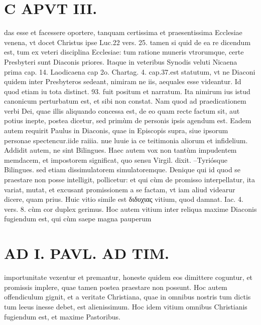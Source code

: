 \documentclass{article}
\begin{document}
\begin{pages}
\section*{C APVT III. }
\marginpar{[ p.153 ]}\pstart das esse et facessere oportere, tanquam certissima et praesentissima Ecclesiae venena, vt docet Christus ipse Luc.22 vers. 25. tamen si quid de ea re dicendum est, tum ex veteri disciplina Ecclesiae: tum ratione muneris vtrorumque, certe Presbyteri sunt Diaconis priores. Itaque in veteribus Synodis veluti Nicaena prima cap. 14. Laodicaena cap 2o. Chartag. 4. cap.37.est statutum, vt ne Diaconi quidem inter Presbyteros sedeant, nimiram ne iis, aequales esse videantur. Id quod etiam iu tota distinct. 93. fuit positum et narratum. Ita nimirum ius istud canonicum perturbatum est, et sibi non constat. Nam quod ad praedicationem verbi Dei, quae illis aliquando concessa est, de eo quam recte factum sit, aut potius inepte, postea dicetur, sed primùm de personis ipsis agendum est.  \pend\pstart Eadem autem requirit Paulus in Diaconis, quae in Episcopis supra, siue ipsorum personae spectencur.iide raiiia. nue luuie ia ce teitimonia aliorum et infidelium. Addidit autem, ne sint Bilingues. Haec autem vox non tantùm impudentem memdacem, et impostorem significat, quo sensu Virgil. dixit.  \pend\pstart –Tyriósque Bilingues.  \pend\pstart sed etiam dissimulatorem simulatoremque. Denique qui id quod se praestare non posse intelligit, pollicetur: et qui cùm de promisso interpellatur, ita variat, mutat, et excusant promissionem a se factam, vt iam aliud videarur dicere, quam prius. Huic vitio simile est διδυχιας vitium, quod damnat. Iac. 4. vers. 8. cùm cor duplex gerimus. Hoc autem vitium inter reliqua maxime Diaconis fugiendum est, qui cùm saepe magna pauperum  \pend
\section*{AD I. PAVL. AD TIM. }
\marginpar{[ p.160 ]}\pstart importunitate vexentur et premantur, honeste quidem eos dimittere coguntur, et promissis implere, quae tamen postea praestare non possunt. Hoc autem offendiculum gignit, et a veritate Christiana, quae in omnibus nostris tum dictis tum leeus inesse debet, est alienissimum. Hoc idem vitium omnibus Christianis fugiendum est, et maxime Pastoribus.  \pend
{}
{}

\end{pages}
\end{document}
